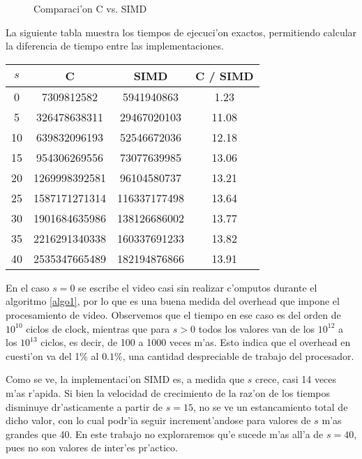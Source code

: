 \begin{figure}[H]
	\begin{center}
		
	\end{center}		
	\caption{Comparaci'on C vs. SIMD}
	\label{fig8}
\end{figure}

La siguiente tabla muestra los tiempos de ejecuci'on exactos, permitiendo calcular la diferencia de tiempo entre las implementaciones.

\begin{center}
\begin{tabular}{|c|c|c|c|}
\hline
$s$ & \textbf{C} & \textbf{SIMD} & \textbf{C / SIMD}\\
\hline
0 & 7309812582 & 5941940863 & 1.23\\
5 & 326478638311 & 29467020103 & 11.08\\
10 & 639832096193 & 52546672036 & 12.18\\
15 & 954306269556 & 73077639985 & 13.06\\
20 & 1269998392581 & 96104580737 & 13.21\\
25 & 1587171271314 & 116337177498 & 13.64\\
30 & 1901684635986 & 138126686002 & 13.77\\
35 & 2216291340338 & 160337691233 & 13.82\\
40 & 2535347665489 & 182194876866 & 13.91\\
\hline
\end{tabular} 
\end{center}

En el caso $s = 0$ se escribe el video casi sin realizar c'omputos durante el algoritmo \ref{algo1}, por lo que es una buena medida del overhead que impone el procesamiento de video. Observemos que el tiempo en ese caso es del orden de $10^{10}$ ciclos de clock, mientras que para $s > 0$ todos los valores van de los $10^{12}$ a los $10^{13}$ ciclos, es decir, de 100 a 1000 veces m'as. Esto indica que el overhead en cuesti'on va del 1\% al $0.1\%$, una cantidad despreciable de trabajo del procesador.

Como se ve, la implementaci'on SIMD es, a medida que $s$ crece, casi 14 veces m'as r'apida. Si bien la velocidad de crecimiento de la raz'on de los tiempos disminuye dr'asticamente a partir de $s = 15$, no se ve un estancamiento total de dicho valor, con lo cual podr'ia seguir increment'andose para valores de $s$ m'as grandes que 40. En este trabajo no exploraremos qu'e sucede m'as all'a de $s = 40$, pues no son valores de inter'es pr'actico.

